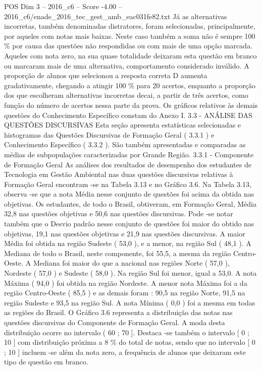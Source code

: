 \begin{textsample}{POS Dim 3 – 2016\_c6 – Score -4.00 – 2016\_c6/enade\_2016\_tec\_gest\_amb\_eac031fe82.txt}
Já as alternativas incorretas, também denominadas distratores, foram selecionadas, principalmente, por aqueles com notas mais baixas.
Neste caso também a soma não é sempre 100 \% por causa das questões não respondidas ou com mais de uma opção marcada.
Aqueles com nota zero, na sua quase totalidade deixaram esta questão em branco ou marcaram mais de uma alternativa, comportamento considerado inválido.
A proporção de alunos que selecionou a resposta correta D aumenta gradativamente, chegando a atingir 100 \% para 20 acertos, enquanto a proporção dos que escolheram alternativas incorretas decai, a partir de três acertos, como função do número de acertos nessa parte da prova.
Os gráficos relativos às demais questões do Conhecimento Específico constam do Anexo I. 3.3 - ANÁLISE DAS QUESTÕES DISCURSIVAS Esta seção apresenta estatísticas selecionadas e histogramas das Questões Discursivas de Formação Geral ( 3.3.1 ) e Conhecimento Específico ( 3.3.2 ).
São também apresentadas e comparadas as médias de subpopulações caracterizadas por Grande Região. 3.3.1 - Componente de Formação Geral As análises dos resultados de desempenho dos estudantes de Tecnologia em Gestão Ambiental nas duas questões discursivas relativas à Formação Geral encontram -se na Tabela 3.13 e no Gráfico 3.6.
Na Tabela 3.13, observa -se que a nota Média nesse conjunto de questões foi acima da obtida nas objetivas.
Os estudantes, de todo o Brasil, obtiveram, em Formação Geral, Média 32,8 nas questões objetivas e 50,6 nas questões discursivas.
Pode -se notar também que o Desvio padrão nesse conjunto de questões foi maior do obtido nas objetivas, 19,1 nas questões objetivas e 21,9 nas questões discursivas.
A maior Média foi obtida na região Sudeste ( 53,0 ), e a menor, na região Sul ( 48,1 ).
A Mediana de todo o Brasil, neste componente, foi 55,5, a mesma da região Centro-Oeste.
A Mediana foi maior do que a nacional nas regiões Norte ( 57,0 ), Nordeste ( 57,0 ) e Sudeste ( 58,0 ).
Na região Sul foi menor, igual a 53,0.
A nota Máxima ( 94,0 ) foi obtida na região Nordeste.
A menor nota Máxima foi a da região Centro-Oeste ( 85,5 ) e as demais foram : 90,5 na região Norte, 91,5 na região Sudeste e 93,5 na região Sul.
A nota Mínima ( 0,0 ) foi a mesma em todas as regiões do Brasil.
O Gráfico 3.6 representa a distribuição das notas nas questões discursivas do Componente de Formação Geral.
A moda desta distribuição ocorre no intervalo ( 60 ; 70 ].
Destaca -se também o intervalo [ 0 ; 10 ] com distribuição próxima a 8 \% do total de notas, sendo que no intervalo [ 0 ; 10 ] incluem -se além da nota zero, a frequência de alunos que deixaram este tipo de questão em branco.

\end{textsample}
